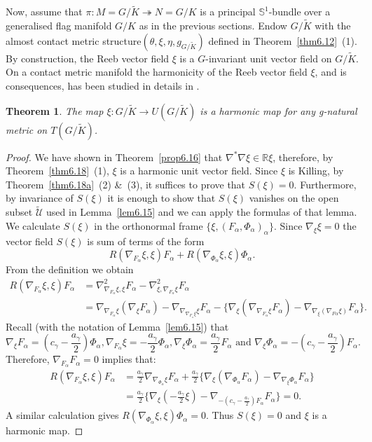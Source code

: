 \documentclass[a4paper,reqno]{amsart}
\newtheorem{thm}{Theorem}[section]
\theoremstyle{definition}
\theoremstyle{remark}
\theoremstyle{plain}
\numberwithin{equation}{section}
\newcommand{\R}{{\mathbb{R}}}
\newcommand{\bbS}{{\mathbb{S}}}
\newcommand{\sto}{\twoheadrightarrow}
\newcommand{\Kt}{{\widetilde{K}}}
\newcommand{\wK}{{\widetilde{K}}}
\newcommand{\Ut}{{\widetilde{\mathcal{U}}}}
\newcommand{\ACMS}{almost contact metric
  structure\xspace}
\newcommand{\txeMK}{{(\theta,\xi,\eta,g_{\scriptscriptstyle{G/\wK}})}}
\begin{document}
Now, assume that $\pi : M= G/\Kt \sto N= G/K$ is a principal
$\bbS^1$-bundle over a generalised flag manifold $G/K$ as in the
previous sections.
Endow $G/\Kt$ with the \ACMS $\txeMK$
defined in Theorem~\ref{thm6.12}~(1). By construction, the Reeb vector
field $\xi$ is a $G$-invariant unit vector field on $G/\Kt$.
  On a contact metric manifold the harmonicity of the Reeb vector field
  $\xi$, and is consequences, has been studied in details in
  \cite[\S7]{ACP}.


\begin{thm}
  \label{thm6.20}
  The map $\xi : G/\Kt \to U(G/\Kt)$ is a harmonic map for any
  g-natural metric on $T(G/\Kt)$.
\end{thm}

\begin{proof}
  We have shown in Theorem~\ref{prop6.16} that
  $\nabla^*\nabla \xi \in \R \xi$, therefore, by
  Theorem~\ref{thm6.18}~(1), $\xi$ is a harmonic unit vector
  field. Since $\xi$ is Killing, by Theorem~\ref{thm6.18a}~(2) \&~(3), it
  suffices to prove that $S(\xi)=0$. Furthermore, by invariance
  of $S(\xi)$ it is enough to show that $S(\xi)$ vanishes on the
  open subset $\Ut$ used in Lemma~\ref{lem6.15} and we can apply
  the formulas of that lemma. We calculate $S(\xi)$ in the
  orthonormal frame $\{\xi,
  (F_\alpha,\Phi_\alpha)_\alpha\}$. %
  Since $\nabla_\xi\xi = 0$ the vector field $S(\xi)$ is sum of
  terms of the form
  $${R}(\nabla_{F_\alpha}\xi,\xi)F_\alpha
  + {R}(\nabla_{\Phi_\alpha}\xi,\xi)\Phi_\alpha.$$  From
  the definition we obtain
\begin{align*}
{R}(\nabla_{F_\alpha}\xi,\xi)F_\alpha &  =
\nabla^2_{\nabla_{F_\alpha} \xi,\xi}F_\alpha -
  \nabla^2_{\xi,\nabla_{F_\alpha}\xi} F_\alpha  \\ &=
  \nabla_{\nabla_{F_\alpha} \xi}(\nabla_\xi F_\alpha) -
  \nabla_{\nabla_{\nabla_{F_\alpha} \xi} \xi}F_\alpha
  -\bigl\{\nabla_\xi(\nabla_{\nabla_{F_\alpha}\xi}F_\alpha)  -
  \nabla_{\nabla_\xi(\nabla_{F\alpha}\xi)} F_\alpha \bigr\}.
\end{align*}
Recall (with the notation of  Lemma~\ref{lem6.15}) that
$$\nabla_\xi {F_\alpha} = (c_\gamma - \frac{a_\gamma}{2}) 
\Phi_\alpha, \nabla_{F_\alpha} \xi = - \frac{a_\gamma}{2} 
\Phi_\alpha, \nabla_\xi {\Phi_\alpha} = \frac{a_\gamma}{2} 
F_\alpha \mbox{ and } \nabla_\xi {\Phi_\alpha} = - (c_\gamma - \frac{a_\gamma}{2}) 
F_\alpha.$$ Therefore, $\nabla_{F_\alpha}F_\alpha =0$ 
implies that:
\begin{align*}
{R}(\nabla_{F_\alpha}\xi,\xi)F_\alpha & =  \frac{a_\gamma}{2} 
   \nabla_{\nabla_{\Phi_\alpha} \xi}F_\alpha 
 + \frac{a_\gamma}{2}\bigl\{ \nabla_\xi(\nabla_{\Phi_\alpha}F_\alpha) -
  \nabla_{\nabla_\xi \Phi_\alpha} F_\alpha \bigr\} \\
 & =  \frac{a_\gamma}{2}\bigl\{ \nabla_\xi(- \frac{a_\gamma}{2}\xi) -
  \nabla_{ - (c_\gamma - \frac{a_\gamma}{2}) 
F_\alpha} F_\alpha \bigr\} = 0.
\end{align*}
A similar calculation gives
$R(\nabla_{\Phi_\alpha}\xi,\xi)\Phi_\alpha=0$. Thus $S(\xi)
= 0$ and $\xi$ is a harmonic map.
\end{proof}
\end{document}
